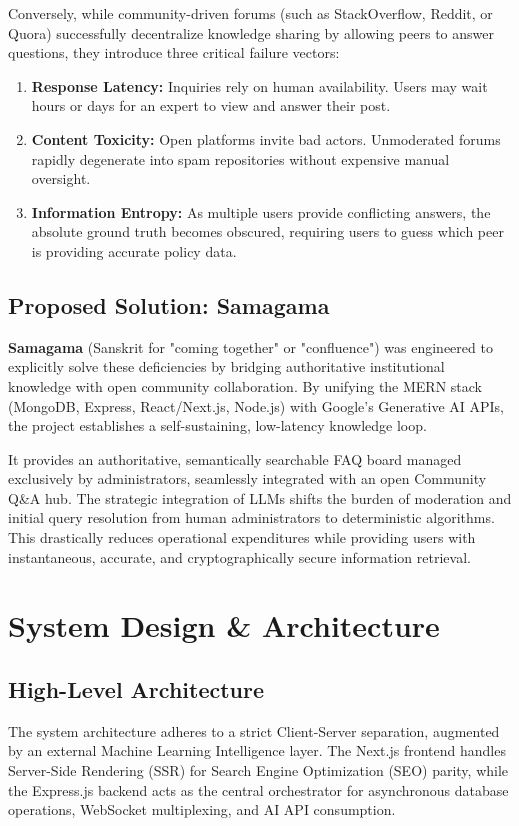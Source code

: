 \documentclass[12pt,a4paper]{article}
\begin{document}
Conversely, while community-driven forums (such as StackOverflow, Reddit, or Quora) successfully decentralize knowledge sharing by allowing peers to answer questions, they introduce three critical failure vectors:
\begin{enumerate}
    \item \textbf{Response Latency:} Inquiries rely on human availability. Users may wait hours or days for an expert to view and answer their post.
    \item \textbf{Content Toxicity:} Open platforms invite bad actors. Unmoderated forums rapidly degenerate into spam repositories without expensive manual oversight.
    \item \textbf{Information Entropy:} As multiple users provide conflicting answers, the absolute ground truth becomes obscured, requiring users to guess which peer is providing accurate policy data.
\end{enumerate}

\subsection{Proposed Solution: Samagama}
\textbf{Samagama} (Sanskrit for "coming together" or "confluence") was engineered to explicitly solve these deficiencies by bridging authoritative institutional knowledge with open community collaboration. By unifying the MERN stack (MongoDB, Express, React/Next.js, Node.js) with Google's Generative AI APIs, the project establishes a self-sustaining, low-latency knowledge loop. 

It provides an authoritative, semantically searchable FAQ board managed exclusively by administrators, seamlessly integrated with an open Community Q\&A hub. The strategic integration of LLMs shifts the burden of moderation and initial query resolution from human administrators to deterministic algorithms. This drastically reduces operational expenditures while providing users with instantaneous, accurate, and cryptographically secure information retrieval.

\newpage

\section{System Design \& Architecture}
\vspace{0.5cm}

\subsection{High-Level Architecture}
The system architecture adheres to a strict Client-Server separation, augmented by an external Machine Learning Intelligence layer. The Next.js frontend handles Server-Side Rendering (SSR) for Search Engine Optimization (SEO) parity, while the Express.js backend acts as the central orchestrator for asynchronous database operations, WebSocket multiplexing, and AI API consumption.
\end{document}
